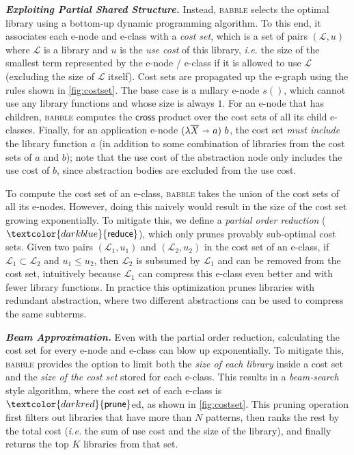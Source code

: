 \documentclass[acmsmall,screen,nonacm,review=false,timestamp=false]{acmart}
\newcommand{\ie}{\emph{i.e.}\xspace}
\newcommand{\emphbf}[1]{\emph{\textbf{#1}\xspace}}
\newcommand{\mypara}[1]{\smallskip\noindent\emphbf{#1.}\xspace}
\newcommand{\eclasses}{e-classes\xspace}
\newcommand{\tname}[1]{\textsc{#1}\xspace}
\newcommand{\babble}{\tname{babble}}
\newcommand{\tool}{\tname{babble}}
\newcommand{\many}[1]{\overline{#1}}
\newcommand{\bnd}{\ \mathbf{\shortrightarrow}\ }
\newcommand{\libset}{\mathcal{L}}
\newcommand{\sfunify}{\ensuremath{\textcolor{darkblue}{\mathsf{reduce}}}}
\newcommand{\sfprune}{\ensuremath{\textcolor{darkred}{\mathsf{prune}}}}
\begin{document}
\mypara{Exploiting Partial Shared Structure}
Instead, \tool selects the optimal library using a bottom-up dynamic programming algorithm.
To this end, it associates each e-node and e-class with a \emph{cost set},
which is a set of pairs $(\libset, u)$
  where $\libset$ is a library and $u$ is the \emph{use cost} of this library,
  \ie the size of the smallest term represented by the e-node / e-class if it is allowed to use $\libset$
  (excluding the size of $\libset$ itself).
Cost sets are propagated up the e-graph using the rules shown in \autoref{fig:costset}.
The base case is a nullary e-node $s()$,
  which cannot use any library functions and whose size is always $1$.
For an e-node that has children,
\babble computes the $\mathsf{cross}$ product over the cost sets of all its child \eclasses.
Finally, for an application e-node $(\lambda \many{X} \bnd a)\ b$,
  the cost set \emph{must include} the library function $a$
  (in addition to some combination of libraries from the cost sets of $a$ and $b$);
  note that the use cost of the abstraction node only includes the use cost of $b$,
  since abstraction bodies are excluded from the use cost.


To compute the cost set of an e-class,
  \babble takes the union of the cost sets of all its e-nodes.
However, doing this naively would result in the size of the cost set growing exponentially.
To mitigate this, we define a \emph{partial order reduction} ($\sfunify$),
which only prunes provably sub-optimal cost sets.
Given two pairs $(\libset_1, u_1)$ and $(\libset_2, u_2)$ in the cost set of an e-class, 
if $\libset_1 \subset \libset_2$ and $u_1 \leq u_2$, 
then $\libset_2$ is subsumed by $\libset_1$ and can be removed from the cost set,
intuitively because $\libset_1$ can compress this e-class even better and with fewer library functions.
In practice this optimization prunes libraries with redundant abstraction,
where two different abstractions can be used to compress the same subterms.













\mypara{Beam Approximation}
Even with the partial order reduction,
  calculating the cost set for every e-node and e-class
  can blow up exponentially.
To mitigate this,
  \tool provides the option to limit
  both the \emph{size of each library} inside a cost set
  and the \emph{size of the cost set} stored for each e-class.
This results in a \emph{beam-search} style algorithm,
where the cost set of each e-class is $\sfprune$ed, as shown in \autoref{fig:costset}.
This pruning operation first filters out libraries that have more than $N$ patterns,
then ranks the rest by the total cost (\ie the sum of use cost and the size of the library),
and finally returns the top $K$ libraries from that set.
  
\end{document}
